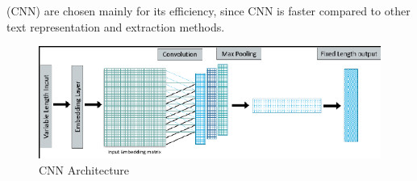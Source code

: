 \documentclass[12pt,a4paper]{report}     %
\begin{document}
\begin{normalsize}
{{{\- (CNN) are chosen mainly for its efficiency, since CNN is faster compared to other text representation and extraction methods.\\
\begin{figure}[htp]
    \centering
    \includegraphics[width=14cm]{cnn.png}
    \caption{CNN Architecture}
    \label{fig:architetcture}
\end{figure}
}
}
\newpage
}
\end{normalsize}
\end{document}
